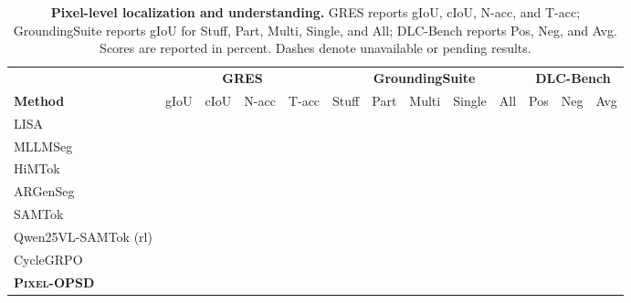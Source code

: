 \documentclass{article}
\newcommand{\POna}{\textcolor{POMuted}{\textemdash}}
\newcommand{\POhead}[1]{\textcolor{POInk}{\textbf{#1}}}
\newcommand{\ours}{\textsc{Pixel-OPSD}}
\begin{document}
\begin{table}[t]
\centering
\caption{\textbf{Pixel-level localization and understanding.} GRES reports gIoU, cIoU, N-acc, and T-acc; GroundingSuite reports gIoU for Stuff, Part, Multi, Single, and All; DLC-Bench reports Pos, Neg, and Avg. Scores are reported in percent. Dashes denote unavailable or pending results.}
\label{tab:main}
\begingroup
\footnotesize
\setlength{\tabcolsep}{2.3pt}
\setlength{\extrarowheight}{0pt}
\renewcommand{\arraystretch}{1.2}
\begin{tabularx}{\textwidth}{>{\raggedright\arraybackslash}X*{12}{r}}
\toprule
& \multicolumn{4}{c}{\POhead{GRES}} & \multicolumn{5}{c}{\POhead{GroundingSuite}} & \multicolumn{3}{c}{\POhead{DLC-Bench}} \\
\cmidrule(lr){2-5}\cmidrule(lr){6-10}\cmidrule(lr){11-13}
\rowcolor{POBlue}
\POhead{Method} & gIoU & cIoU & N-acc & T-acc & Stuff & Part & Multi & Single & All & Pos & Neg & Avg \\
\midrule
LISA & \POna & \POna & \POna & \POna & \POna & \POna & \POna & \POna & \POna & \POna & \POna & \POna \\
MLLMSeg & \POna & \POna & \POna & \POna & \POna & \POna & \POna & \POna & \POna & \POna & \POna & \POna \\
HiMTok & \POna & \POna & \POna & \POna & \POna & \POna & \POna & \POna & \POna & \POna & \POna & \POna \\
ARGenSeg & \POna & \POna & \POna & \POna & \POna & \POna & \POna & \POna & \POna & \POna & \POna & \POna \\
SAMTok & \POna & \POna & \POna & \POna & \POna & \POna & \POna & \POna & \POna & \POna & \POna & \POna \\
Qwen25VL-SAMTok (rl) & \POna & \POna & \POna & \POna & \POna & \POna & \POna & \POna & \POna & \POna & \POna & \POna \\
CycleGRPO & \POna & \POna & \POna & \POna & \POna & \POna & \POna & \POna & \POna & \POna & \POna & \POna \\
\midrule
\rowcolor{POTeal}
\textbf{\ours{}} & \POna & \POna & \POna & \POna & \POna & \POna & \POna & \POna & \POna & \POna & \POna & \POna \\
\bottomrule
\end{tabularx}
\endgroup
\end{table}
\end{document}
